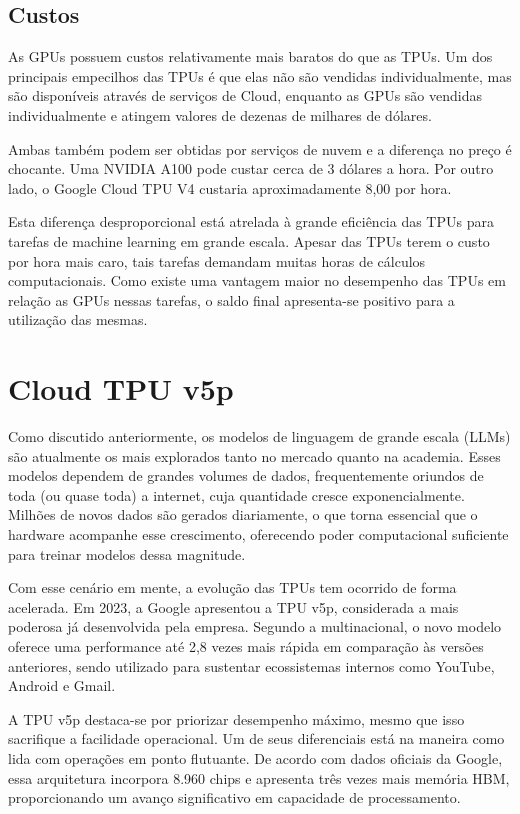 \documentclass{report}
\begin{document}
\section{Custos}

As GPUs possuem custos relativamente mais baratos do que as TPUs. Um dos principais empecilhos das TPUs é que elas não são vendidas individualmente, mas são disponíveis através de serviços de Cloud, enquanto as GPUs são vendidas individualmente e atingem valores de dezenas de milhares de dólares.

Ambas também podem ser obtidas por serviços de nuvem e a diferença no preço é chocante. Uma NVIDIA A100 pode custar cerca de 3 dólares a hora. Por outro lado, o Google Cloud TPU V4 custaria aproximadamente 8,00 por hora.

Esta diferença desproporcional está atrelada à grande eficiência das TPUs para tarefas de machine learning em grande escala. Apesar das TPUs terem o custo por hora mais caro, tais tarefas demandam muitas horas de cálculos computacionais. Como existe uma vantagem maior no desempenho das TPUs em relação as GPUs nessas tarefas, o saldo final apresenta-se positivo para a utilização das mesmas.

\chapter{Cloud TPU v5p}

Como discutido anteriormente, os modelos de linguagem de grande escala (LLMs) são atualmente os mais explorados tanto no mercado quanto na academia. Esses modelos dependem de grandes volumes de dados, frequentemente oriundos de toda (ou quase toda) a internet, cuja quantidade cresce exponencialmente. Milhões de novos dados são gerados diariamente, o que torna essencial que o hardware acompanhe esse crescimento, oferecendo poder computacional suficiente para treinar modelos dessa magnitude.

Com esse cenário em mente, a evolução das TPUs tem ocorrido de forma acelerada. Em 2023, a Google apresentou a TPU v5p, considerada a mais poderosa já desenvolvida pela empresa. Segundo a multinacional, o novo modelo oferece uma performance até 2,8 vezes mais rápida em comparação às versões anteriores, sendo utilizado para sustentar ecossistemas internos como YouTube, Android e Gmail.

A TPU v5p destaca-se por priorizar desempenho máximo, mesmo que isso sacrifique a facilidade operacional. Um de seus diferenciais está na maneira como lida com operações em ponto flutuante. De acordo com dados oficiais da Google, essa arquitetura incorpora 8.960 chips e apresenta três vezes mais memória HBM, proporcionando um avanço significativo em capacidade de processamento.
\end{document}
